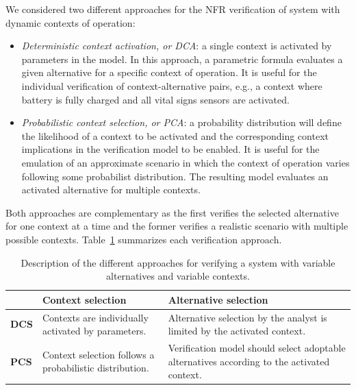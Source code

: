 We considered two different approaches for the NFR verification of system with dynamic contexts of operation:

\begin{itemize}

\item \textit{Deterministic context activation, or DCA}: a single context is activated by parameters in the model. In this approach, a parametric formula evaluates a given alternative for a specific context of operation. It is useful for the individual verification of context-alternative pairs, e.g., a context where battery is fully charged and all vital signs sensors are activated.
\medskip

\item \textit{Probabilistic context selection, or PCA}: a probability distribution will define the likelihood of a context to be activated and the corresponding context implications in the verification model to be enabled. It is useful for the emulation of an approximate scenario in which the context of operation varies following some probabilist distribution. The resulting model evaluates an activated alternative for multiple contexts. 

\end{itemize}

Both approaches are complementary as the first verifies the selected alternative for one context at a time and the former verifies a realistic scenario with multiple possible contexts. Table~\ref{tab:SC_DCA_PCA} summarizes each verification approach.

\begin{table}[h]
{\renewcommand{\arraystretch}{2.5}
\begin{tabularx}{\textwidth}{@{}l|XX@{}}
\toprule
			 &                                                         \textbf{Context selection}			 &                                                                                                      \textbf{Alternative selection}			\\ \midrule
\textbf{DCS} & Contexts are individually activated by parameters.  & Alternative selection by the analyst is limited by the activated context.                                                                                    \\
\textbf{PCS} & Context selection follows a probabilistic distribution. & Verification model should select adoptable alternatives according to the activated context.\\ \bottomrule
\end{tabularx}
}
\caption{Description of the different approaches for verifying a system with variable alternatives and variable contexts.}
\label{tab:SC_DCA_PCA}
\end{table}

